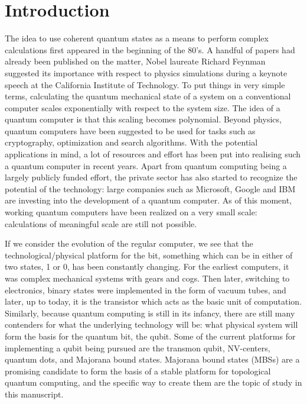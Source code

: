 \chapter{Introduction}

	The idea to use coherent quantum states as a means to perform complex calculations first appeared in the beginning of the 80's.
	A handful of papers had already been published on the matter, Nobel laureate Richard Feynman suggested its importance with respect to physics simulations during a keynote speech at the California Institute of Technology.
	To put things in very simple terms, calculating the quantum mechanical state of a system on a conventional computer scales exponentially with respect to the system size.
	The idea of a quantum computer is that this scaling becomes polynomial.
	Beyond physics, quantum computers have been suggested to be used for tasks such as cryptography, optimization and search algorithms.
	With the potential applications in mind, a lot of resources and effort has been put into realising such a quantum computer in recent years.
	Apart from quantum computing being a largely publicly funded effort, the private sector has also started to recognize the potential of the technology: large companies such as Microsoft, Google and IBM are investing into the development of a quantum computer.
	As of this moment, working quantum computers have been realized on a very small scale: calculations of meaningful scale are still not possible.

	If we consider the evolution of the regular computer, we see that the technological/physical platform for the bit, something which can be in either of two states, 1 or 0, has been constantly changing.
	For the earliest computers, it was complex mechanical systems with gears and cogs.
	Then later, switching to electronics, binary states were implemented in the form of vacuum tubes, and later, up to today, it is the transistor which acts as the basic unit of computation.
	Similarly, because quantum computing is still in its infancy, there are still many contenders for what the underlying technology will be: what physical system will form the basis for the quantum bit, the qubit.
	Some of the current platforms for implementing a qubit being pursued are the transmon qubit, NV-centers, quantum dots, and Majorana bound states.
	Majorana bound states (MBSs) are a promising candidate to form the basis of a stable platform for topological quantum computing, and the specific way to create them are the topic of study in this manuscript.

